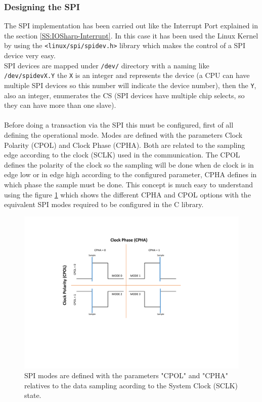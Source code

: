 \subsubsection{Designing the SPI}\label{SSS:IOSharp-SPI-Design}
The SPI implementation has been carried out like the Interrupt Port explained in the section \ref{SS:IOSharp-Interrupt}. In this case it has been used the Linux Kernel by using the \verb!<linux/spi/spidev.h>! library which makes the control of a SPI device very easy.
\\
SPI devices are mapped under \verb!/dev/! directory with a naming like \verb!/dev/spidevX.Y! the \verb!X! is an integer and represents the device (a CPU can have multiple SPI devices so this number will indicate the device number), then the \verb!Y!, also an integer, enumerates the \gls{CS} (SPI devices have multiple chip selects, so they can have more than one slave).
\\
\\
Before doing a transaction via the SPI this must be configured, first of all defining the operational mode. Modes are defined with the parameters Clock Polarity (CPOL) and Clock Phase (CPHA). Both are related to the sampling edge according to the clock (SCLK) used in the communication. The CPOL defines the polarity of the clock so the sampling will be done when de clock is in edge low or in edge high according to the configured parameter, CPHA defines in which phase the sample must be done. This concept is much easy to understand using the figure \ref{fig:spi-modes} which shows the different CPHA and CPOL options with the equivalent SPI modes required to be configured in the C library.

\begin{figure}[H]\begin{center}
 \centering
  \captionsetup{justification=centering}
  \includegraphics[scale=0.7]{pictures/iosharp/spi-modes}
  \caption{SPI modes are defined with the parameters "CPOL" and "CPHA" relatives to the data sampling acording to the System Clock (SCLK) state.\label{fig:spi-modes}}
\end{center}\end{figure}

